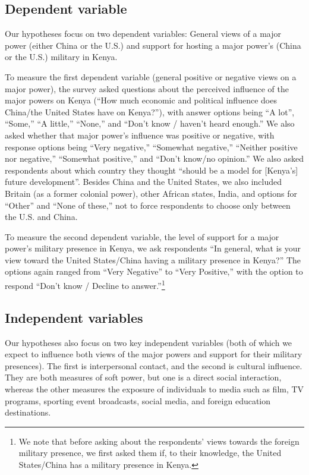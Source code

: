 \subsection*{Dependent variable} 

Our hypotheses focus on two dependent variables: General views of a major power (either China or the U.S.) and support for hosting a major power's (China or the U.S.) military in Kenya. 

To measure the first dependent variable (general positive or negative views on a major power), the survey asked questions about the perceived influence of the major powers on Kenya (``How much economic and political influence does China/the United States have on Kenya?''), with answer options being ``A lot'', ``Some,'' ``A little,'' ``None,'' and ``Don’t know / haven’t heard enough.'' We also asked whether that major power's influence was positive or negative, with response options being ``Very negative,'' ``Somewhat negative,'' ``Neither positive nor negative,'' ``Somewhat positive,'' and ``Don't know/no opinion.'' We also asked respondents about which country they thought ``should be a model for [Kenya's] future development''. Besides China and the United States, we also 
included Britain (as a former colonial power), other African states, India, and options for ``Other'' and ``None of these,'' not to force respondents to choose only between the U.S. and China.

To measure the second dependent variable, the level of support for a major power's military presence in Kenya, we ask respondents ``In general, what is your view toward the United States/China having a military presence in Kenya?'' The options again ranged from ``Very Negative'' to ``Very Positive,'' with the option to respond ``Don’t know / Decline to answer.''\footnote{We note that before asking about the respondents' views towards the foreign military presence, we first asked them if, to their knowledge, the United States/China has a military presence in Kenya.}  

\subsection*{Independent variables} 

Our hypotheses also focus on two key independent variables (both of which we expect to influence both views of the major powers and support for their military presences). The first is interpersonal contact, and the second is cultural influence. They are both measures of soft power, but one is a direct social interaction, whereas the other measures the exposure of individuals to media such as film, TV programs, sporting event broadcasts, social media, and foreign education destinations. 

